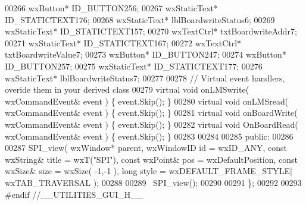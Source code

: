 \begin{DoxyCode}
00266         wxButton* ID_BUTTON256;
00267         wxStaticText* ID_STATICTEXT176;
00268         wxStaticText* lblBoardwriteStatus6;
00269         wxStaticText* ID_STATICTEXT157;
00270         wxTextCtrl* txtBoardwriteAddr7;
00271         wxStaticText* ID_STATICTEXT167;
00272         wxTextCtrl* txtBoardwriteValue7;
00273         wxButton* ID_BUTTON247;
00274         wxButton* ID_BUTTON257;
00275         wxStaticText* ID_STATICTEXT177;
00276         wxStaticText* lblBoardwriteStatus7;
00277         
00278         \textcolor{comment}{// Virtual event handlers, overide them in your derived class}
00279         \textcolor{keyword}{virtual} \textcolor{keywordtype}{void} onLMSwrite( wxCommandEvent& event ) \{ \textcolor{keyword}{event}.Skip(); \}
00280         \textcolor{keyword}{virtual} \textcolor{keywordtype}{void} onLMSread( wxCommandEvent& event ) \{ \textcolor{keyword}{event}.Skip(); \}
00281         \textcolor{keyword}{virtual} \textcolor{keywordtype}{void} onBoardWrite( wxCommandEvent& event ) \{ \textcolor{keyword}{event}.Skip(); \}
00282         \textcolor{keyword}{virtual} \textcolor{keywordtype}{void} OnBoardRead( wxCommandEvent& event ) \{ \textcolor{keyword}{event}.Skip(); \}
00283         
00284     
00285     \textcolor{keyword}{public}:
00286         
00287         SPI_view( wxWindow* parent, wxWindowID \textcolor{keywordtype}{id} = wxID\_ANY, \textcolor{keyword}{const} wxString& title = wxT(\textcolor{stringliteral}{"SPI"}), \textcolor{keyword}{const} 
      wxPoint& pos = wxDefaultPosition, \textcolor{keyword}{const} wxSize& size = wxSize( -1,-1 ), \textcolor{keywordtype}{long} style = wxDEFAULT\_FRAME\_STYLE|
      wxTAB\_TRAVERSAL );
00288         
00289         ~SPI_view();
00290     
00291 \};
00292 
00293 \textcolor{preprocessor}{#endif //\_\_UTILITIES\_GUI\_H\_\_}
\end{DoxyCode}
